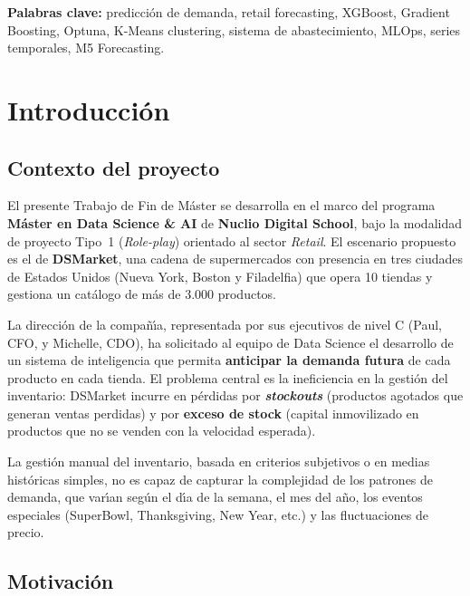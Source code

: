 \documentclass[12pt, a4paper, oneside]{report}
\begin{document}
\bigskip
\noindent\textbf{Palabras clave:} predicci\'on de demanda, retail forecasting, XGBoost, Gradient Boosting, Optuna, K-Means clustering, sistema de abastecimiento, MLOps, series temporales, M5 Forecasting.

\tableofcontents
\clearpage
\listoftables
{}
\clearpage

\chapter{Introducci\'on}

\section{Contexto del proyecto}

El presente Trabajo de Fin de M\'aster se desarrolla en el marco del programa \textbf{M\'aster en Data Science \& AI} de \textbf{Nuclio Digital School}, bajo la modalidad de proyecto Tipo~1 (\textit{Role-play}) orientado al sector \textit{Retail}. El escenario propuesto es el de \textbf{DSMarket}, una cadena de supermercados con presencia en tres ciudades de Estados Unidos (Nueva York, Boston y Filadelfia) que opera 10 tiendas y gestiona un cat\'alogo de m\'as de 3.000 productos.

La direcci\'on de la compa\~n\'{\i}a, representada por sus ejecutivos de nivel C (Paul, CFO, y Michelle, CDO), ha solicitado al equipo de Data Science el desarrollo de un sistema de inteligencia que permita \textbf{anticipar la demanda futura} de cada producto en cada tienda. El problema central es la ineficiencia en la gesti\'on del inventario: DSMarket incurre en p\'erdidas por \textbf{\textit{stockouts}} (productos agotados que generan ventas perdidas) y por \textbf{exceso de stock} (capital inmovilizado en productos que no se venden con la velocidad esperada).

La gesti\'on manual del inventario, basada en criterios subjetivos o en medias hist\'oricas simples, no es capaz de capturar la complejidad de los patrones de demanda, que var\'{\i}an seg\'un el d\'{\i}a de la semana, el mes del a\~no, los eventos especiales (SuperBowl, Thanksgiving, New Year, etc.) y las fluctuaciones de precio.

\section{Motivaci\'on}
\end{document}
